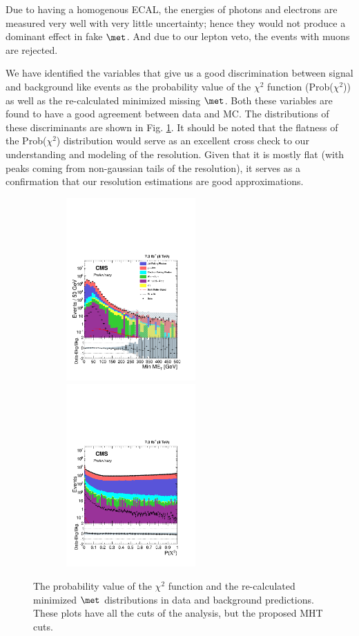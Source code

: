 Due to having a homogenous ECAL, the energies of photons and electrons are measured very well with very little uncertainty; hence they would not produce a dominant effect in fake  ${\met}$. And due to our lepton veto, the events with muons are rejected.

We have identified the variables that give us a good discrimination between signal and background like events as the probability value of the  $\chi^2$ function (Prob($\chi^2$)) as well as the re-calculated minimized missing ${\met}$.  Both these variables are found to have a good agreement between data and MC. The distributions of these discriminants are shown in Fig. \ref{fig:dist}. It should be noted that the flatness of the Prob($\chi^2$) distribution would serve as an excellent cross check to our understanding and modeling of the resolution. Given that it is mostly flat (with peaks coming from non-gaussian tails of the resolution), it serves as a confirmation that our resolution estimations are good approximations. 


\begin{figure}[!h]
 \centering
  {\label{fig:dista}\includegraphics[width=7.5cm,height=7cm]{analysis_figs/StackedHisto_minMET.pdf}}
  {\label{fig:distb}\includegraphics[width=7.5cm,height=7cm]{analysis_figs/StackedHisto_pvalue_notlog.pdf}} 
 \caption{ The probability value of the  $\chi^2$ function and the re-calculated minimized ${\met}$ distributions in data and background predictions. These plots have all the cuts of the analysis, but the proposed MHT cuts. } 
 \label{fig:dist}
\end{figure}   

